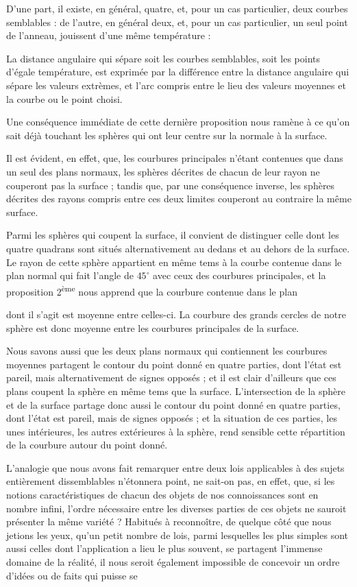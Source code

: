 \documentclass[11pt,a4paper]{article}
\begin{document}
D'une part, il existe, en général, quatre, et, pour un cas particulier, deux
courbes semblables : de l'autre, en général deux, et, pour un cas
particulier, un seul point de l'anneau, jouissent d'une même température :

La distance angulaire qui sépare soit les courbes semblables, soit les
points d'égale température, est exprimée par la différence entre la distance
angulaire qui sépare les valeurs extrèmes, et l'arc \ill{} compris entre le
lieu des valeurs moyennes et la courbe ou le point choisi.

Une conséquence immédiate de cette dernière proposition nous ramène à ce
qu'on sait déjà touchant les sphères qui ont leur centre sur la normale à la
surface.

Il est évident, en effet, que, les courbures principales n'étant contenues
que dans un seul des plans normaux, les sphères décrites de chacun de leur
rayon ne couperont pas la surface ; tandis que, par une conséquence inverse,
les sphères décrites des rayons compris entre ces deux limites couperont au
contraire la même surface.

Parmi les sphères qui coupent la surface, il convient de distinguer celle
dont les quatre quadrans sont situés alternativement au dedans et au dehors
de la surface. Le rayon de cette sphère appartient en même tems à la courbe
contenue dans le plan normal qui fait l'angle de $45^{\circ}$ avec ceux des
courbures principales, et la proposition 2\textsuperscript{ème} nous apprend que
la courbure contenue dans le plan

dont il s'agit est moyenne entre celles-ci. La courbure des grands cercles
de notre sphère est donc moyenne entre les courbures principales de la
surface.

Nous savons aussi que les deux plans normaux qui contiennent les courbures
moyennes partagent le contour du point donné en quatre parties, dont l'état
est pareil, mais alternativement de signes opposés ; et il est clair
d'ailleurs que ces plans coupent la sphère en même tems que la surface.
L'intersection de la sphère et de la surface partage donc aussi le contour
du point donné en quatre parties, dont l'état est pareil, mais de signes
opposés ; et la situation de ces parties, les unes intérieures, les autres
extérieures à la sphère, rend sensible cette répartition de la courbure
autour du point donné.

L'analogie que nous avons fait remarquer entre deux lois applicables à des
sujets entièrement dissemblables n'étonnera point, ne sait-on pas, en effet,
que, si les notions caractéristiques de chacun des objets de nos
connoissances sont en nombre infini, l'ordre nécessaire entre les diverses
parties de ces objets ne sauroit présenter la même variété ? Habitués à
reconnoître, de quelque côté que nous jetions les yeux, qu'un petit nombre
de lois, parmi lesquelles les plus simples sont aussi celles dont
l'application a lieu le plus souvent, se partagent l'immense domaine de la
réalité, il nous seroit également impossible de concevoir un ordre d'idées
ou de faits qui puisse se
\end{document}
